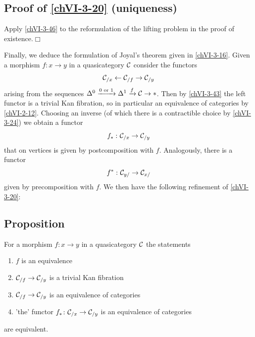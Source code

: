     \subsection{Proof of \ref{chVI-3-20} (uniqueness)}
        Apply \ref{chVI-3-46} to the reformulation of the lifting problem in the proof of existence.\hfill$\Box$
        \medskip

        Finally, we deduce the formulation of Joyal's theorem given in \ref{chVI-3-16}. Given a morphism $f \colon x \to y$ in a quasicategory $\mathcal{C}$ consider the functors
        \begin{equation*}
            \mathcal{C}_{/ x} \leftarrow \mathcal{C}_{/ f} \rightarrow \mathcal{C}_{/ y} 
        \end{equation*}
        arising from the sequences $\Delta^0 \xrightarrow{0 \text{ or } 1} \Delta^1 \xrightarrow{f} \mathcal{C} \rightarrow *$. Then by \ref{chVI-3-43} the left functor is a trivial Kan fibration, so in particular an equivalence of categories by \ref{chVI-2-12}. Choosing an inverse (of which there is a contractible choice by \ref{chVI-3-24}) we obtain a functor
        \begin{equation*}
            f_* \,\colon \mathcal{C}_{/ x} \to \mathcal{C}_{/ y}
        \end{equation*}
        that on vertices is given by postcomposition with $f$. Analogously, there is a functor
        \begin{equation*}
            f^* \,\colon \mathcal{C}_{y /} \to \mathcal{C}_{x /}
        \end{equation*}
        given by precomposition with $f$. We then have the following refinement of \ref{chVI-3-20}:

    \subsection{Proposition}\label{chVI-3-47}
        For a morphism $f \colon x \to y$ in a quasicategory $\mathcal{C}$ the statements
        \begin{enumerate}[label=\roman*)]
            \item 
                $f$ is an equivalence \label{chVI-3-47-i}
            \item 
                $\mathcal{C}_{/ f} \to \mathcal{C}_{/ y}$ is a trivial Kan fibration \label{chVI-3-47-ii}
            \item 
                $\mathcal{C}_{/ f} \to \mathcal{C}_{/ y}$ is an equivalence of categories \label{chVI-3-47-iii}
            \item 
                'the' functor $f_* \colon \mathcal{C}_{/ x} \to \mathcal{C}_{/ y}$ is an equivalence of categories \label{chVI-3-47-iv}
        \end{enumerate}	
        are equivalent.
        \smallskip

